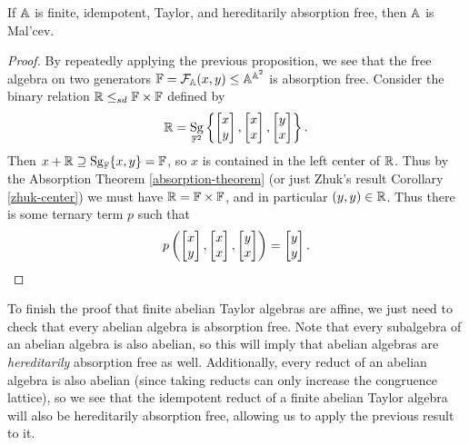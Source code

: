 \documentclass[letterpaper,11pt]{article}
\DeclareMathOperator{\Sg}{Sg}
\begin{document}
\begin{thm}\label{haf-malcev} If $\mathbb{A}$ is finite, idempotent, Taylor, and hereditarily absorption free, then $\mathbb{A}$ is Mal'cev.
\end{thm}
\begin{proof} By repeatedly applying the previous proposition, we see that the free algebra on two generators $\mathbb{F} = \mathcal{F}_{\mathbb{A}}(x,y) \le \mathbb{A}^{\mathbb{A}^2}$ is absorption free. Consider the binary relation $\mathbb{R} \le_{sd} \mathbb{F}\times \mathbb{F}$ defined by
\[
\RR = \Sg_{\bF^2}\left\{\begin{bmatrix} x\\ y\end{bmatrix}, \begin{bmatrix} x\\ x\end{bmatrix}, \begin{bmatrix} y\\ x\end{bmatrix}\right\}.
\]
Then $x+\RR \supseteq \Sg_\bF\{x,y\} = \bF$, so $x$ is contained in the left center of $\mathbb{R}$. Thus by the Absorption Theorem \ref{absorption-theorem} (or just Zhuk's result Corollary \ref{zhuk-center}) we must have $\mathbb{R} = \mathbb{F} \times \mathbb{F}$, and in particular $(y,y) \in \mathbb{R}$. Thus there is some ternary term $p$ such that
\[
p\left(\begin{bmatrix} x\\ y\end{bmatrix}, \begin{bmatrix} x\\ x\end{bmatrix}, \begin{bmatrix} y\\ x\end{bmatrix}\right) = \begin{bmatrix} y\\ y\end{bmatrix}.\qedhere
\]
\end{proof}

To finish the proof that finite abelian Taylor algebras are affine, we just need to check that every abelian algebra is absorption free. Note that every subalgebra of an abelian algebra is also abelian, so this will imply that abelian algebras are \emph{hereditarily} absorption free as well. Additionally, every reduct of an abelian algebra is also abelian (since taking reducts can only increase the congruence lattice), so we see that the idempotent reduct of a finite abelian Taylor algebra will also be hereditarily absorption free, allowing us to apply the previous result to it.
\end{document}
